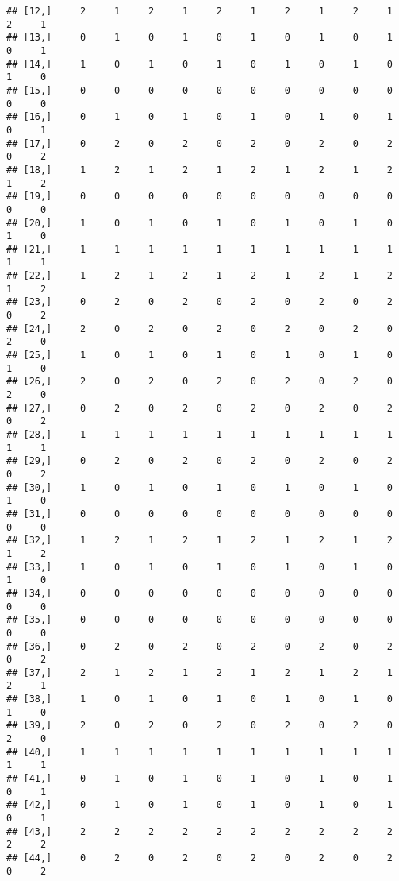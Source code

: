 \documentclass[
]{article}
\begin{document}
\begin{verbatim}
## [12,]     2     1     2     1     2     1     2     1     2     1     2     1
## [13,]     0     1     0     1     0     1     0     1     0     1     0     1
## [14,]     1     0     1     0     1     0     1     0     1     0     1     0
## [15,]     0     0     0     0     0     0     0     0     0     0     0     0
## [16,]     0     1     0     1     0     1     0     1     0     1     0     1
## [17,]     0     2     0     2     0     2     0     2     0     2     0     2
## [18,]     1     2     1     2     1     2     1     2     1     2     1     2
## [19,]     0     0     0     0     0     0     0     0     0     0     0     0
## [20,]     1     0     1     0     1     0     1     0     1     0     1     0
## [21,]     1     1     1     1     1     1     1     1     1     1     1     1
## [22,]     1     2     1     2     1     2     1     2     1     2     1     2
## [23,]     0     2     0     2     0     2     0     2     0     2     0     2
## [24,]     2     0     2     0     2     0     2     0     2     0     2     0
## [25,]     1     0     1     0     1     0     1     0     1     0     1     0
## [26,]     2     0     2     0     2     0     2     0     2     0     2     0
## [27,]     0     2     0     2     0     2     0     2     0     2     0     2
## [28,]     1     1     1     1     1     1     1     1     1     1     1     1
## [29,]     0     2     0     2     0     2     0     2     0     2     0     2
## [30,]     1     0     1     0     1     0     1     0     1     0     1     0
## [31,]     0     0     0     0     0     0     0     0     0     0     0     0
## [32,]     1     2     1     2     1     2     1     2     1     2     1     2
## [33,]     1     0     1     0     1     0     1     0     1     0     1     0
## [34,]     0     0     0     0     0     0     0     0     0     0     0     0
## [35,]     0     0     0     0     0     0     0     0     0     0     0     0
## [36,]     0     2     0     2     0     2     0     2     0     2     0     2
## [37,]     2     1     2     1     2     1     2     1     2     1     2     1
## [38,]     1     0     1     0     1     0     1     0     1     0     1     0
## [39,]     2     0     2     0     2     0     2     0     2     0     2     0
## [40,]     1     1     1     1     1     1     1     1     1     1     1     1
## [41,]     0     1     0     1     0     1     0     1     0     1     0     1
## [42,]     0     1     0     1     0     1     0     1     0     1     0     1
## [43,]     2     2     2     2     2     2     2     2     2     2     2     2
## [44,]     0     2     0     2     0     2     0     2     0     2     0     2

\end{verbatim}
\end{document}
